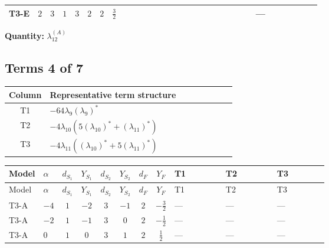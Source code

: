 \documentclass[8pt]{article}
\begin{document}
\begin{landscape}
\begin{longtable}{@{}llcccccc >{\raggedright\arraybackslash}p{0.21\linewidth} >{\raggedright\arraybackslash}p{0.21\linewidth} >{\raggedright\arraybackslash}p{0.21\linewidth}@{}}
\midrule
T3-E & $2$ & $3$ & $1$ & $3$ & $2$ & $2$ & $\frac{3}{2}$ & \scriptsize\adjustbox{max width=\linewidth}{$\begin{gathered} +2 {\lambda_{12}^{(A)}} {\lambda_{S_1}^{(1)}}\end{gathered}$} & \scriptsize\adjustbox{max width=\linewidth}{$\begin{gathered} +2 {\lambda_{12}^{(A)}} {\lambda_{S_2}^{(1)}}\end{gathered}$} & --- \\
\midrule
\bottomrule
\end{longtable}
\clearpage
\noindent\textbf{Quantity: }$\lambda_{12}^{(A)}$\par\smallskip
\subsection*{Terms 4 of 7}
\begin{center}
\begin{tabular}{@{}c >{\raggedright\arraybackslash}p{0.82\linewidth}@{}}
\toprule
Column & Representative term structure \\
\midrule
T1 & \(\displaystyle -64 {\lambda_{9}} \left({\lambda_{9}}\right)^{*}\) \\
\midrule
T2 & \(\displaystyle -4 {\lambda_{10}} (5 \left({\lambda_{10}}\right)^{*}+\left({\lambda_{11}}\right)^{*})\) \\
\midrule
T3 & \(\displaystyle -4 {\lambda_{11}} (\left({\lambda_{10}}\right)^{*}+5 \left({\lambda_{11}}\right)^{*})\) \\
\midrule
\bottomrule
\end{tabular}
\end{center}
\smallskip
\tiny
\begin{longtable}{@{}llcccccc >{\raggedright\arraybackslash}p{0.21\linewidth} >{\raggedright\arraybackslash}p{0.21\linewidth} >{\raggedright\arraybackslash}p{0.21\linewidth}@{}}
\toprule
Model & $\alpha$ & $d_{S_1}$ & $Y_{S_1}$ & $d_{S_2}$ & $Y_{S_2}$ & $d_F$ & $Y_F$ & T1 & T2 & T3 \\
\midrule
\endfirsthead
\toprule
Model & $\alpha$ & $d_{S_1}$ & $Y_{S_1}$ & $d_{S_2}$ & $Y_{S_2}$ & $d_F$ & $Y_F$ & T1 & T2 & T3 \\
\midrule
\endhead
T3-A & $-4$ & $1$ & $-2$ & $3$ & $-1$ & $2$ & $-\frac{3}{2}$ & --- & --- & --- \\
\midrule
T3-A & $-2$ & $1$ & $-1$ & $3$ & $0$ & $2$ & $-\frac{1}{2}$ & --- & --- & --- \\
\midrule
T3-A & $0$ & $1$ & $0$ & $3$ & $1$ & $2$ & $\frac{1}{2}$ & --- & --- & --- \\

\end{longtable}
\end{landscape}
\end{document}
